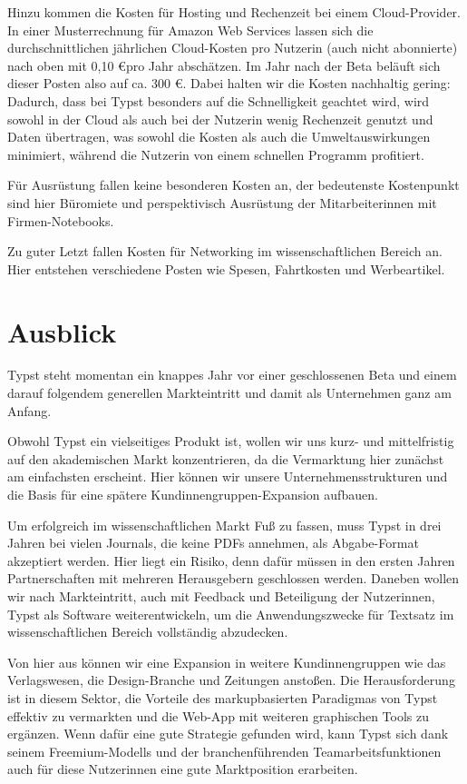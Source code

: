 \documentclass[11pt, a4paper]{article}
\newcommand{\gender}{\raisebox{-.25em}{*}}
\let\oldsection\section
\renewcommand\section{\clearpage\oldsection}
\begin{document}
Hinzu kommen die Kosten für Hosting und Rechenzeit bei einem Cloud-Provider. In einer Musterrechnung für Amazon Web Services lassen sich die durchschnittlichen jährlichen Cloud-Kosten pro Nutzer\gender{}in (auch nicht abonnierte) nach oben mit 0,10 \euro pro Jahr abschätzen. Im Jahr nach der Beta beläuft sich dieser Posten also auf ca. 300 \euro. Dabei halten wir die Kosten nachhaltig gering: Dadurch, dass bei Typst besonders auf die Schnelligkeit geachtet wird, wird sowohl in der Cloud als auch bei der\gender{} Nutzer\gender{}in wenig Rechenzeit genutzt und Daten übertragen, was sowohl die Kosten als auch die Umweltauswirkungen minimiert, während die\gender{} Nutzer\gender{}in von einem schnellen Programm profitiert.

Für Ausrüstung fallen keine besonderen Kosten an, der bedeutenste Kostenpunkt sind hier Büromiete und perspektivisch Ausrüstung der Mitarbeiter\gender{}innen mit Firmen-Notebooks.

Zu guter Letzt fallen Kosten für Networking im wissenschaftlichen Bereich an. Hier entstehen verschiedene Posten wie Spesen, Fahrtkosten und Werbeartikel.

\section*{Ausblick}
\vspace{2mm}

Typst steht momentan ein knappes Jahr vor einer geschlossenen Beta und einem darauf folgendem generellen Markteintritt und damit als Unternehmen ganz am Anfang.

Obwohl Typst ein vielseitiges Produkt ist, wollen wir uns kurz- und mittelfristig auf den akademischen Markt konzentrieren, da die Vermarktung hier zunächst am einfachsten erscheint. Hier können wir unsere Unternehmensstrukturen und die Basis für eine spätere Kund\gender{}innengruppen-Expansion aufbauen.

Um erfolgreich im wissenschaftlichen Markt Fuß zu fassen, muss Typst in drei Jahren bei vielen Journals, die keine PDFs annehmen, als Abgabe-Format akzeptiert werden. Hier liegt ein Risiko, denn dafür müssen in den ersten Jahren Partnerschaften mit mehreren Herausgebern geschlossen werden. Daneben wollen wir nach Markteintritt, auch mit Feedback und Beteiligung der Nutzer\gender{}innen, Typst als Software weiterentwickeln, um die Anwendungszwecke für Textsatz im wissenschaftlichen Bereich vollständig abzudecken.

Von hier aus können wir eine Expansion in weitere Kund\gender{}innengruppen wie das Verlagswesen, die Design-Branche und Zeitungen anstoßen. Die Herausforderung ist in diesem Sektor, die Vorteile des markupbasierten Paradigmas von Typst effektiv zu vermarkten und die Web-App mit weiteren graphischen Tools zu ergänzen. Wenn dafür eine gute Strategie gefunden wird, kann Typst sich dank seinem Freemium-Modells und der branchenführenden Teamarbeitsfunktionen auch für diese Nutzer\gender{}innen eine gute Marktposition erarbeiten.
\end{document}
